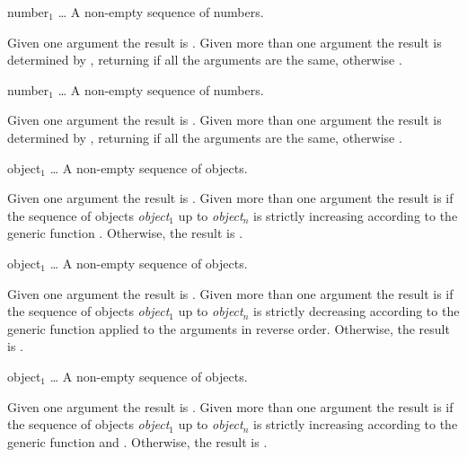 \begin{optDefinition}
\function{=}
%
\begin{arguments}
    \item[{number$_1$ \ldots}] A non-empty sequence of numbers.
\end{arguments}
%
\result%
Given one argument the result is \true{}.  Given more than one argument the
result is determined by , returning \true{} if all the
arguments are the same, otherwise \nil{}.

\function{!=}
%
\begin{arguments}
    \item[{number$_1$ \ldots}] A non-empty sequence of numbers.
\end{arguments}
%
\result%
Given one argument the result is \nil{}.  Given more than one argument the result
is determined by , returning \nil{} if all the arguments are
the same, otherwise \true{}.

\function{<}
%
\begin{arguments}
    \item[object$_1$ \ldots] A non-empty sequence of objects.
\end{arguments}
%
\result%
Given one argument the result is \true{}.  Given more than one argument the
result is \true{} if the sequence of objects {\em object$_1$} up to {\em
    object$_n$} is strictly increasing according to the generic function
.  Otherwise, the result is \nil{}.

\function{>}
%
\begin{arguments}
    \item[object$_1$ \ldots] A non-empty sequence of objects.
\end{arguments}
%
\result%
Given one argument the result is \true{}.  Given more than one argument the
result is \true{} if the sequence of objects {\em object$_1$} up to {\em
    object$_n$} is strictly decreasing according to the generic function
 applied to the arguments in reverse order.  Otherwise, the
result is \nil{}.

\function{<=}
%
\begin{arguments}
    \item[object$_1$ \ldots] A non-empty sequence of objects.
\end{arguments}
%
\result%
Given one argument the result is \true{}.  Given more than one argument the
result is \true{} if the sequence of objects {\em object$_1$} up to {\em
    object$_n$} is strictly increasing according to the generic function
 and .  Otherwise, the result is \nil{}.


\end{optDefinition}
